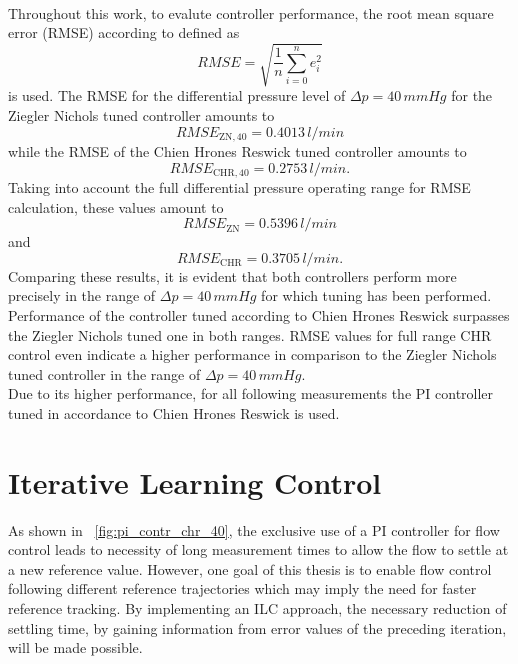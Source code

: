 \\Throughout this work, to evalute controller performance, the root mean square error (RMSE) according to \cite{RMSE} defined as
\begin{equation}
  RMSE = \sqrt{\frac{1}{n}\sum_{i=0}^n e_i^2}
\end{equation}
is used. The RMSE for the differential pressure level of $\Delta{p}=40\,mmHg$ for the Ziegler Nichols tuned controller amounts to
\begin{equation}
  RMSE_{\mathrm{ZN,40}}=0.4013\,l/min
\end{equation}
while the RMSE of the Chien Hrones Reswick tuned controller amounts to
\begin{equation}
  RMSE_{\mathrm{CHR,40}}=0.2753\,l/min.
\end{equation}
\newpage
Taking into account the full differential pressure operating range for RMSE calculation, these values amount to
\begin{equation}
  RMSE_{\mathrm{ZN}}=0.5396\,l/min
\end{equation}
and
\begin{equation}
  RMSE_{\mathrm{CHR}}=0.3705\,l/min.
\end{equation}
Comparing these results, it is evident that both controllers perform more precisely in the range of $\Delta{p}=40\,mmHg$ for which tuning has been performed.
Performance of the controller tuned according to Chien Hrones Reswick surpasses the Ziegler Nichols tuned one in both ranges. RMSE values for full range CHR control even indicate a higher performance in comparison to the Ziegler Nichols tuned controller in the range of $\Delta{p}=40\,mmHg$.
\\ Due to its higher performance, for all following measurements the PI controller tuned in accordance to Chien Hrones Reswick is used.
\section{Iterative Learning Control}\label{ILC_1}
As shown in \figurename~\ref{fig:pi_contr_chr_40}, the exclusive use of a PI controller for flow control leads to necessity of long measurement times to allow the flow to settle at a new reference value. However, one goal of this thesis is to enable flow control following different reference trajectories which may imply the need for faster reference tracking. By implementing an ILC approach, the necessary reduction of settling time, by gaining information from error values of the preceding iteration, will be made possible.
